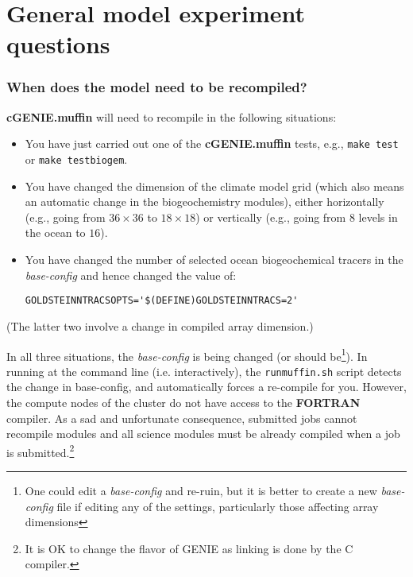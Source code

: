 \documentclass[11pt,fleqn]{book} %
\begin{document}

\newpage


\section{General model experiment questions}

%
\subsubsection{When does the model need to be recompiled?}

\textbf{cGENIE.muffin} will need to recompile in the following situations:

\begin{itemize}

\vspace{1mm}
\item You have just carried out one of the \textbf{cGENIE.muffin} tests, e.g., \texttt{make test} or \texttt{make testbiogem}.
\item You have changed the dimension of the climate model grid (which also means an automatic change in the biogeochemistry modules), either horizontally (e.g., going from \(36\times 36\) to \(18\times 18\)) or vertically (e.g., going from \(8\) levels in the ocean to \(16\)).
\item You have changed the number of selected ocean biogeochemical tracers in the \textit{base-config} and hence changed the value of:
\small\begin{verbatim}
GOLDSTEINNTRACSOPTS='$(DEFINE)GOLDSTEINNTRACS=2'
\end{verbatim}\normalsize

\end{itemize}
(The latter two involve a change in compiled array dimension.)

In all three situations, the \textit{base-config }is being changed (or should be\footnote{One could edit a \textit{base-config} and re-ruin, but it is better to create a new \textit{base-config }file if editing any of the settings, particularly those affecting array dimensions}). In running at the command line (i.e. interactively), the \texttt{\footnotesize runmuffin.sh} script detects the change in base-config, and automatically forces a re-compile for you. However, the compute nodes of the cluster do not have access to the \textbf{FORTRAN} compiler. As a sad and unfortunate consequence, submitted jobs cannot recompile modules and all science modules must be already compiled when a job is submitted.\footnote{It is OK to change the flavor of GENIE as linking is done by the C compiler.}
\end{document}

